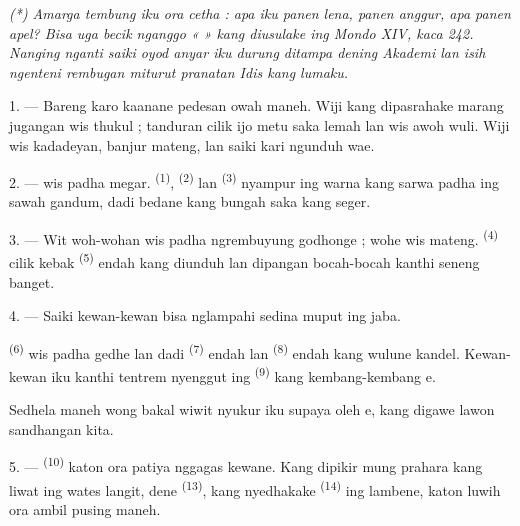 \textit{(*) Amarga tembung iku ora cetha : apa iku panen lena, panen
anggur, apa panen apel? Bisa uga becik nganggo «} 
\textit{» kang diusulake ing Mondo XIV, kaca 242. Nanging nganti saiki
oyod anyar iku durung ditampa dening Akademi lan isih ngenteni
rembugan miturut pranatan Idis kang lumaku.}

\VUsaut{5.0mm}
\VUsaut{3.0mm}
\VUsaut{3.0mm}
\VUsaut{4.0mm}
\VUsaut{3.0mm}

1. --- Bareng karo  kaanane pedesan owah maneh.
Wiji kang dipasrahake marang jugangan wis thukul ; tanduran cilik ijo
metu saka lemah lan wis awoh wuli. Wiji wis kadadeyan, banjur mateng,
lan saiki kari ngunduh wae.

2. ---  wis padha megar.  \textsuperscript{(1)}, 
\textsuperscript{(2)} lan  \textsuperscript{(3)}
nyampur ing warna kang sarwa padha ing sawah gandum, dadi bedane kang
bungah saka  kang seger.

3. --- Wit woh-wohan wis padha ngrembuyung godhonge ; wohe wis mateng.
 \textsuperscript{(4)} cilik kebak 
\textsuperscript{(5)} endah kang diunduh lan dipangan bocah-bocah kanthi
seneng banget.

4. --- Saiki kewan-kewan bisa nglampahi sedina muput ing jaba.

 \textsuperscript{(6)} wis padha gedhe lan dadi
 \textsuperscript{(7)} endah lan  \textsuperscript{(8)} endah kang wulune kandel. Kewan-kewan iku
kanthi tentrem nyenggut  ing 
\textsuperscript{(9)} kang kembang-kembang e.

Sedhela maneh wong bakal wiwit nyukur  iku supaya oleh
e, kang digawe lawon sandhangan kita.

\VUsaut{5.0mm}
\VUsaut{3.4mm}

5. ---  \textsuperscript{(10)} katon ora patiya nggagas
kewane. Kang dipikir mung prahara kang liwat ing wates langit, dene
 \textsuperscript{(13)}, kang nyedhakake
 \textsuperscript{(14)} ing lambene, katon luwih
ora ambil pusing maneh.

